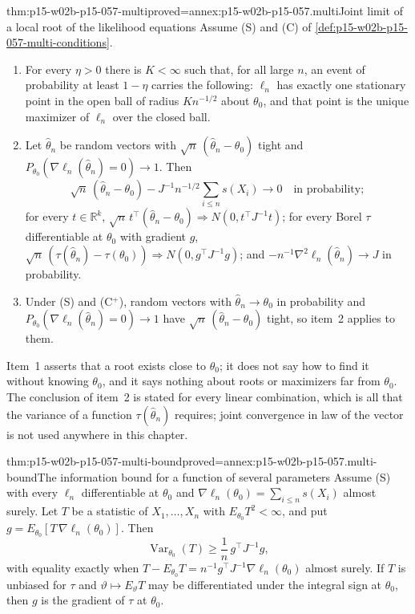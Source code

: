 \begin{hbtheorem}{thm:p15-w02b-p15-057-multi}{proved=annex:p15-w02b-p15-057.multi}{Joint limit of a local root of the likelihood equations}
Assume (S) and (C) of \cref{def:p15-w02b-p15-057-multi-conditions}.
\begin{enumerate}
\item For every \(\eta>0\) there is \(K<\infty\) such that, for all large
 \(n\), an event of probability at least \(1-\eta\) carries the following:
 \(\ell_n\) has exactly one stationary point in the open ball of radius
 \(Kn^{-1/2}\) about \(\theta_0\), and that point is the unique maximizer
 of \(\ell_n\) over the closed ball.
\item Let \(\widehat\theta_n\) be random vectors with
 \(\sqrt n\,(\widehat\theta_n-\theta_0)\) tight and
 \(P_{\theta_0}(\nabla\ell_n(\widehat\theta_n)=0)\to1\). Then
 \[
  \sqrt n\,(\widehat\theta_n-\theta_0)
  -J^{-1}n^{-1/2}\sum_{i\leq n}s(X_i)\to0
  \quad\text{in probability};
 \]
 for every \(t\in\mathbb R^k\),
 \(\sqrt n\,t^{\top}(\widehat\theta_n-\theta_0)\Rightarrow
 N(0,t^{\top}J^{-1}t)\); for every Borel \(\tau\) differentiable at
 \(\theta_0\) with gradient \(g\),
 \(\sqrt n\,(\tau(\widehat\theta_n)-\tau(\theta_0))\Rightarrow
 N(0,g^{\top}J^{-1}g)\); and \(-n^{-1}\nabla^2\ell_n(\widehat\theta_n)\to
 J\) in probability.
\item Under (S) and (C\(^{+}\)), random vectors with
 \(\widehat\theta_n\to\theta_0\) in probability and
 \(P_{\theta_0}(\nabla\ell_n(\widehat\theta_n)=0)\to1\) have
 \(\sqrt n\,(\widehat\theta_n-\theta_0)\) tight, so item~2 applies to them.
\end{enumerate}
\end{hbtheorem}

Item~1 asserts that a root exists close to \(\theta_0\); it does not say
how to find it without knowing \(\theta_0\), and it says nothing about
roots or maximizers far from \(\theta_0\). The conclusion of item~2 is
stated for every linear combination, which is all that the variance of a
function \(\tau(\widehat\theta_n)\) requires; joint convergence in law of
the vector is not used anywhere in this chapter.

\begin{hbtheorem}{thm:p15-w02b-p15-057-multi-bound}{proved=annex:p15-w02b-p15-057.multi-bound}{The information bound for a function of several parameters}
Assume (S) with every \(\ell_n\) differentiable at \(\theta_0\) and
\(\nabla\ell_n(\theta_0)=\sum_{i\leq n}s(X_i)\) almost surely. Let \(T\) be a
statistic of \(X_1,\ldots,X_n\) with \(E_{\theta_0}T^2<\infty\), and put
\(g=E_{\theta_0}[T\,\nabla\ell_n(\theta_0)]\). Then
\[
 \operatorname{Var}_{\theta_0}(T)\geq\frac1n\,g^{\top}J^{-1}g,
\]
with equality exactly when
\(T-E_{\theta_0}T=n^{-1}g^{\top}J^{-1}\nabla\ell_n(\theta_0)\) almost surely.
If \(T\) is unbiased for \(\tau\) and \(\vartheta\mapsto E_\vartheta T\) may
be differentiated under the integral sign at \(\theta_0\), then \(g\) is
the gradient of \(\tau\) at \(\theta_0\).
\end{hbtheorem}

